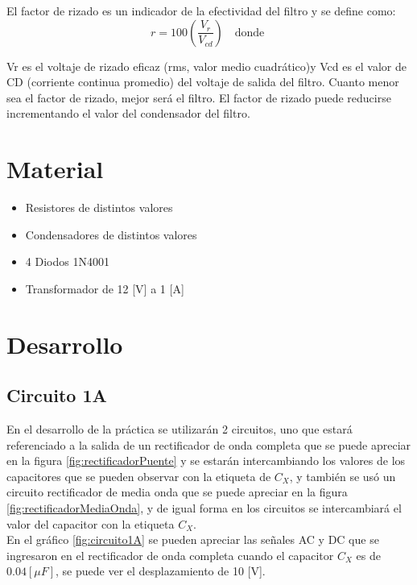 \documentclass{article}
\begin{document}
El factor de rizado es un indicador de la efectividad del filtro y se define como:\\

\begin{equation}
     r = 100\left(\frac{V_r}{V_{cd}}\right) \quad \textrm{donde }
\end{equation}

Vr es el voltaje de rizado eficaz (rms, valor medio cuadrático)y Vcd es el valor de CD (corriente continua promedio) del voltaje de salida del filtro. Cuanto menor sea el factor de rizado, mejor será el filtro. El factor de rizado puede reducirse incrementando el valor del condensador del filtro.\citep{Rizado}\\

 \section{Material}

\begin{itemize}
    \item Resistores de distintos valores
    \item Condensadores de distintos valores
    \item 4 Diodos 1N4001
    \item Transformador de 12 [V] a 1 [A]
    
\end{itemize}

\section{Desarrollo}

\subsection{Circuito 1A}


En el desarrollo de la práctica se utilizarán 2 circuitos, uno que estará referenciado a la salida de un rectificador de onda completa que se puede apreciar en la figura \ref{fig:rectificadorPuente} y se estarán intercambiando los valores de los capacitores que se pueden observar con la etiqueta de $C_X$, y también se usó un circuito rectificador de media onda que se puede apreciar en la figura \ref{fig:rectificadorMediaOnda}, y de igual forma en los circuitos se intercambiará el valor del capacitor con la etiqueta $C_X$.\\

En el gráfico \ref{fig:circuito1A} se pueden apreciar las señales AC y DC que se ingresaron en el rectificador de onda completa cuando el capacitor $C_X$ es de $0.04 [\mu F]$, se puede ver el desplazamiento de 10 [V].
\end{document}
